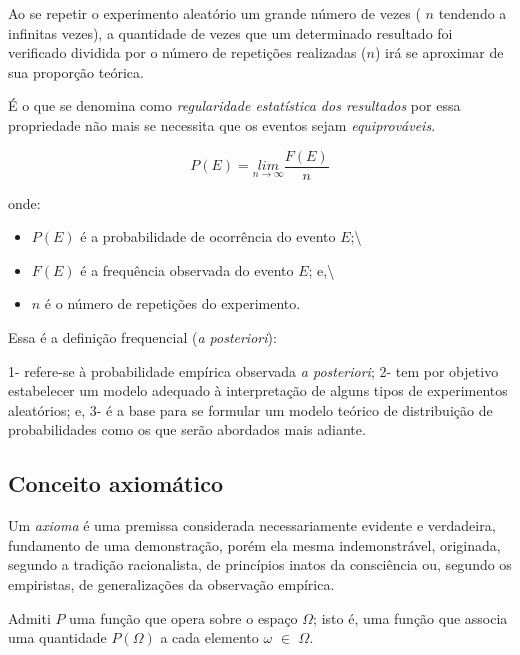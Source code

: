 \documentclass[
]{book}
\providecommand{\tightlist}{%
  \setlength{\itemsep}{0pt}\setlength{\parskip}{0pt}}
\begin{document}
Ao se repetir o experimento aleatório um grande número de vezes ( \(n\) tendendo a infinitas vezes), a quantidade de vezes que um determinado resultado foi verificado dividida por o número de repetições realizadas (\(n\)) irá se aproximar de sua proporção teórica.

É o que se denomina como \emph{regularidade estatística dos resultados} por essa propriedade não mais se necessita que os eventos sejam \emph{equiprováveis}.

\[
P\left(E\right)=\underset{n\to \infty }{lim}{\frac{F(E)}{n}}
\]

onde:

\begin{itemize}
\tightlist
\item
  \(P(E)\) é a probabilidade de ocorrência do evento \(E\);\textbackslash{}
\item
  \(F(E)\) é a frequência observada do evento \(E\); e,\textbackslash{}
\item
  \(n\) é o número de repetições do experimento.
\end{itemize}

Essa é a definição frequencial (\emph{a posteriori}):

1- refere-se à probabilidade empírica observada \emph{a posteriori};
2- tem por objetivo estabelecer um modelo adequado à interpretação de alguns tipos de experimentos aleatórios; e,
3- é a base para se formular um modelo teórico de distribuição de probabilidades como os que serão abordados mais adiante.

\hfill\break

\hypertarget{conceito-axiomuxe1tico}{%
\subsection{Conceito axiomático}\label{conceito-axiomuxe1tico}}

\hfill\break

Um \emph{axioma} é uma premissa considerada necessariamente evidente e verdadeira, fundamento de uma demonstração, porém ela mesma indemonstrável, originada, segundo a tradição racionalista, de princípios inatos da consciência ou, segundo os empiristas, de generalizações da observação empírica.

Admiti \(P\) uma função que opera sobre o espaço \(\Omega\); isto é, uma função que associa uma quantidade \(P(\Omega)\) a cada elemento \(\omega\) \(\in\) \(\Omega\).

\hfill\break
\end{document}
